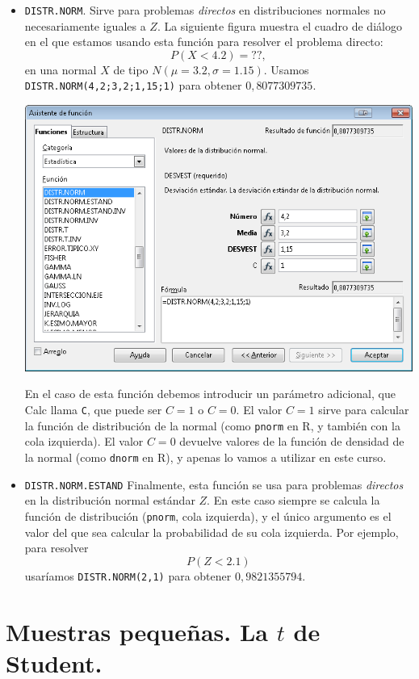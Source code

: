 \documentclass[10pt,a4paper]{article}\usepackage[]{graphicx}\usepackage[]{color}
\begin{document}
\begin{itemize}
  \item {\tt DISTR.NORM}. Sirve para problemas {\em directos} en distribuciones normales no necesariamente iguales a $Z$. La siguiente figura muestra el cuadro de diálogo en el que estamos usando esta función para resolver el problema directo:
      \[P(X<4.2) = ??, \]
      en una normal $X$ de tipo $N(\mu=3.2, \sigma=1.15)$. Usamos {\tt DISTR.NORM(4,2;3,2;1,15;1)} para obtener $0,8077309735$.
            \begin{center}
            \includegraphics[width=13.5cm]{../fig/Tut06-11.png}
            \end{center}
      En el caso de esta función debemos introducir un parámetro adicional, que Calc llama {\tt C}, que puede ser $C=1$ o $C=0$. El valor $C=1$ sirve para calcular la función de distribución de la normal (como {\tt pnorm} en R, y también con la cola izquierda). El valor $C=0$ devuelve valores de la función de densidad de la normal (como {\tt dnorm} en R), y apenas lo vamos a utilizar en este curso.

  \item {\tt DISTR.NORM.ESTAND} Finalmente, esta función se usa para problemas {\em directos} en la distribución normal estándar $Z$. En este caso siempre se calcula la función de distribución ({\tt pnorm}, cola izquierda), y el único argumento es el valor del que sea calcular la probabilidad de su cola izquierda. Por ejemplo, para resolver
      \[P(Z<2.1)\]
      usaríamos {\tt DISTR.NORM(2,1)} para obtener $0,9821355794$.
\end{itemize}


\section{Muestras pequeñas. La $t$ de Student.}
\label{tut06:sec:IntervalosConfianzaMediaStudent}
\end{document}
